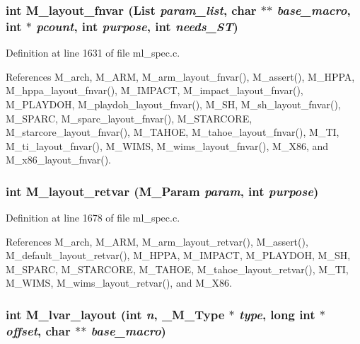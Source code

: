\subsubsection{\setlength{\rightskip}{0pt plus 5cm}int M\_\-layout\_\-fnvar (\bf{List} {\em param\_\-list}, char $\ast$$\ast$ {\em base\_\-macro}, int $\ast$ {\em pcount}, int {\em purpose}, int {\em needs\_\-ST})}\label{ml__spec_8c_648000da60d9181591fb6e3d91bc6345}




Definition at line 1631 of file ml\_\-spec.c.

References M\_\-arch, M\_\-ARM, M\_\-arm\_\-layout\_\-fnvar(), M\_\-assert(), M\_\-HPPA, M\_\-hppa\_\-layout\_\-fnvar(), M\_\-IMPACT, M\_\-impact\_\-layout\_\-fnvar(), M\_\-PLAYDOH, M\_\-playdoh\_\-layout\_\-fnvar(), M\_\-SH, M\_\-sh\_\-layout\_\-fnvar(), M\_\-SPARC, M\_\-sparc\_\-layout\_\-fnvar(), M\_\-STARCORE, M\_\-starcore\_\-layout\_\-fnvar(), M\_\-TAHOE, M\_\-tahoe\_\-layout\_\-fnvar(), M\_\-TI, M\_\-ti\_\-layout\_\-fnvar(), M\_\-WIMS, M\_\-wims\_\-layout\_\-fnvar(), M\_\-X86, and M\_\-x86\_\-layout\_\-fnvar().
\subsubsection{\setlength{\rightskip}{0pt plus 5cm}int M\_\-layout\_\-retvar (\bf{M\_\-Param} {\em param}, int {\em purpose})}\label{ml__spec_8c_1e92200a730058c2abbe820f1dc73882}




Definition at line 1678 of file ml\_\-spec.c.

References M\_\-arch, M\_\-ARM, M\_\-arm\_\-layout\_\-retvar(), M\_\-assert(), M\_\-default\_\-layout\_\-retvar(), M\_\-HPPA, M\_\-IMPACT, M\_\-PLAYDOH, M\_\-SH, M\_\-SPARC, M\_\-STARCORE, M\_\-TAHOE, M\_\-tahoe\_\-layout\_\-retvar(), M\_\-TI, M\_\-WIMS, M\_\-wims\_\-layout\_\-retvar(), and M\_\-X86.
\subsubsection{\setlength{\rightskip}{0pt plus 5cm}int M\_\-lvar\_\-layout (int {\em n}, \bf{\_\-M\_\-Type} $\ast$ {\em type}, long int $\ast$ {\em offset}, char $\ast$$\ast$ {\em base\_\-macro})}\label{ml__spec_8c_1bbc6c0d042d048a9e0eb1fa09d247d7}




